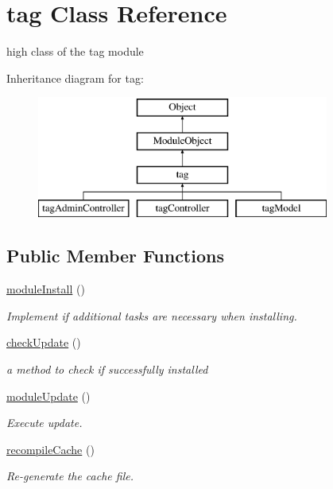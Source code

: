 \hypertarget{classtag}{}\section{tag Class Reference}
\label{classtag}


high class of the tag module  


Inheritance diagram for tag\+:\begin{figure}[H]
\begin{center}
\leavevmode
\includegraphics[height=4.000000cm]{classtag}
\end{center}
\end{figure}
\subsection*{Public Member Functions}
\begin{DoxyCompactItemize}
\item 
\hyperlink{classtag_aa1d24f3693778a2b40dad2f24e8dbafe}{module\+Install} ()
\begin{DoxyCompactList}\small\item\em Implement if additional tasks are necessary when installing. \end{DoxyCompactList}\item 
\hyperlink{classtag_ab8fa1f64862dc89a3a7455ba983a2a34}{check\+Update} ()
\begin{DoxyCompactList}\small\item\em a method to check if successfully installed \end{DoxyCompactList}\item 
\hyperlink{classtag_a4ebfee9c57c877da29b92821b3716060}{module\+Update} ()
\begin{DoxyCompactList}\small\item\em Execute update. \end{DoxyCompactList}\item 
\hyperlink{classtag_a5776ef44ff2110b18834d6b4ad9b9d2d}{recompile\+Cache} ()
\begin{DoxyCompactList}\small\item\em Re-\/generate the cache file. \end{DoxyCompactList}\end{DoxyCompactItemize}

